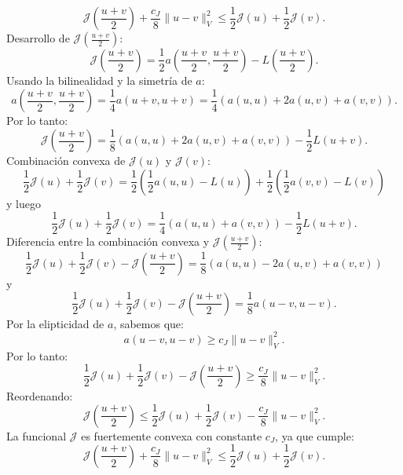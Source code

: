 \documentclass[12pt]{book}
\newtheorem{theorem}{Teorema}
\theoremstyle{definition}
\theoremstyle{plain}
\theoremstyle{remark}
\begin{document}
\[
\mathcal{J}\left(\frac{u+v}{2}\right) + \frac{c_J}{8} \| u - v \|^2_V \leq \frac{1}{2} \mathcal{J}(u) + \frac{1}{2} \mathcal{J}(v).
\]
%
%
Desarrollo de \(\mathcal{J}\left(\frac{u+v}{2}\right)\):
   \[
   \mathcal{J}\left(\frac{u+v}{2}\right) = \frac{1}{2} a\left(\frac{u+v}{2}, \frac{u+v}{2}\right) - L\left(\frac{u+v}{2}\right).
   \]
   Usando la bilinealidad y la simetría de \(a\):
   \[
   a\left(\frac{u+v}{2}, \frac{u+v}{2}\right) = \frac{1}{4} a(u+v, u+v) = \frac{1}{4} \left( a(u,u) + 2a(u,v) + a(v,v) \right).
   \]
   Por lo tanto:
   \[
   \mathcal{J}\left(\frac{u+v}{2}\right) = \frac{1}{8} \left( a(u,u) + 2a(u,v) + a(v,v) \right) - \frac{1}{2} L(u+v).
   \]
Combinación convexa de \(\mathcal{J}(u)\) y \(\mathcal{J}(v)\):
   \[
   \frac{1}{2} \mathcal{J}(u) + \frac{1}{2} \mathcal{J}(v) = \frac{1}{2} \left( \frac{1}{2} a(u,u) - L(u) \right) + \frac{1}{2} \left( \frac{1}{2} a(v,v) - L(v) \right) %
   \]
  y luego
     \[
   \frac{1}{2} \mathcal{J}(u) + \frac{1}{2} \mathcal{J}(v) %
   = \frac{1}{4} \left( a(u,u) + a(v,v) \right) - \frac{1}{2} L(u+v).
   \]
%
Diferencia entre la combinación convexa y \(\mathcal{J}\left(\frac{u+v}{2}\right)\):
   \[
   \frac{1}{2} \mathcal{J}(u) + \frac{1}{2} \mathcal{J}(v) - \mathcal{J}\left(\frac{u+v}{2}\right) = \frac{1}{8} \left( a(u,u) - 2a(u,v) + a(v,v) \right) %
   \]
 y
    \[
   \frac{1}{2} \mathcal{J}(u) + \frac{1}{2} \mathcal{J}(v) - \mathcal{J}\left(\frac{u+v}{2}\right) %
   = \frac{1}{8} a(u-v, u-v).
   \]
   Por la elipticidad de \(a\), sabemos que:
   \[
   a(u-v, u-v) \geq c_J \|u-v\|^2_V.
   \]
   Por lo tanto:
   \[
   \frac{1}{2} \mathcal{J}(u) + \frac{1}{2} \mathcal{J}(v) - \mathcal{J}\left(\frac{u+v}{2}\right) \geq \frac{c_J}{8} \|u-v\|_V^2.
   \]
   Reordenando:
   \[
   \mathcal{J}\left(\frac{u+v}{2}\right) \leq \frac{1}{2} \mathcal{J}(u) + \frac{1}{2} \mathcal{J}(v) - \frac{c_J}{8} \|u-v\|_V^2.
   \]
La funcional \(\mathcal{J}\) es fuertemente convexa con constante \({c_J}\), ya que cumple:
\[
\mathcal{J}\left(\frac{u+v}{2}\right) + \frac{c_J}{8} \|u-v\|_V^2 \leq \frac{1}{2} \mathcal{J}(u) + \frac{1}{2} \mathcal{J}(v).
\]
%
%
%
\end{document}
